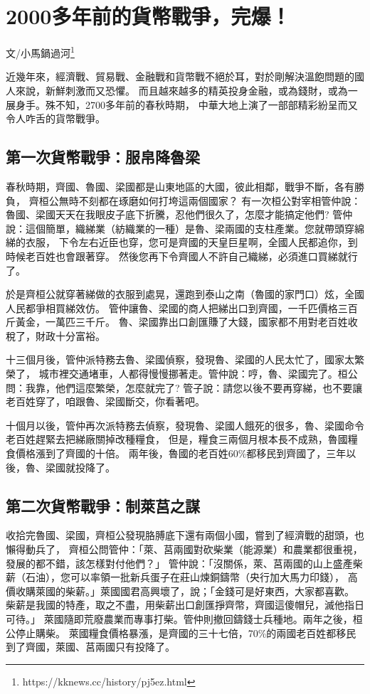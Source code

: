 
\chapter{2000多年前的貨幣戰爭，完爆！}
文/小馬鍋過河\footnote{https://kknews.cc/history/pj5ez.html}

近幾年來，經濟戰、貿易戰、金融戰和貨幣戰不絕於耳，對於剛解決溫飽問題的國人來說，新鮮刺激而又恐懼。
而且越來越多的精英投身金融，或為錢財，或為一展身手。殊不知，2700多年前的春秋時期，
中華大地上演了一部部精彩紛呈而又令人咋舌的貨幣戰爭。

\section{第一次貨幣戰爭：服帛降魯梁}

春秋時期，齊國、魯國、梁國都是山東地區的大國，彼此相鄰，戰爭不斷，各有勝負，
齊桓公無時不刻都在琢磨如何打垮這兩個國家？
有一次桓公對宰相管仲說：魯國、梁國天天在我眼皮子底下折騰，忍他們很久了，怎麼才能搞定他們?
管仲說：這個簡單，織綈業（紡織業的一種）是魯、梁兩國的支柱產業。您就帶頭穿綿綈的衣服，
下令左右近臣也穿，您可是齊國的天皇巨星啊，全國人民都追你，到時候老百姓也會跟著穿。
然後您再下令齊國人不許自己織綈，必須進口買綈就行了。

於是齊桓公就穿著綈做的衣服到處晃，還跑到泰山之南（魯國的家門口）炫，全國人民都爭相買綈效仿。
管仲讓魯、梁國的商人把綈出口到齊國，一千匹價格三百斤黃金，一萬匹三千斤。
魯、梁國靠出口創匯賺了大錢，國家都不用對老百姓收稅了，財政十分富裕。

十三個月後，管仲派特務去魯、梁國偵察，發現魯、梁國的人民太忙了，國家太繁榮了，
城市裡交通堵車，人都得慢慢挪著走。管仲說：哼，魯、梁國完了。桓公問：我靠，他們這麼繁榮，怎麼就完了?
管子說：請您以後不要再穿綈，也不要讓老百姓穿了，咱跟魯、梁國斷交，你看著吧。

十個月以後，管仲再次派特務去偵察，發現魯、梁國人餓死的很多，魯、梁國命令老百姓趕緊去把綈廠關掉改種糧食，
但是，糧食三兩個月根本長不成熟，魯國糧食價格漲到了齊國的十倍。
兩年後，魯國的老百姓60\%都移民到齊國了，三年以後，魯、梁國就投降了。


\section{第二次貨幣戰爭：制萊莒之謀}
收拾完魯國、梁國，齊桓公發現胳膊底下還有兩個小國，嘗到了經濟戰的甜頭，也懶得動兵了，
齊桓公問管仲：「萊、莒兩國對砍柴業（能源業）和農業都很重視，發展的都不錯，該怎樣對付他們？」
管仲說：「沒關係，萊、莒兩國的山上盛產柴薪（石油），您可以率領一批新兵蛋子在莊山煉銅鑄幣（央行加大馬力印錢），
高價收購萊國的柴薪。」萊國國君高興壞了，說；「金錢可是好東西，大家都喜歡。
柴薪是我國的特產，取之不盡，用柴薪出口創匯掙齊幣，齊國這傻帽兒，滅他指日可待。」
萊國隨即荒廢農業而專事打柴。管仲則撤回鑄錢士兵種地。兩年之後，桓公停止購柴。
萊國糧食價格暴漲，是齊國的三十七倍，70\%的兩國老百姓都移民到了齊國，萊國、莒兩國只有投降了。


